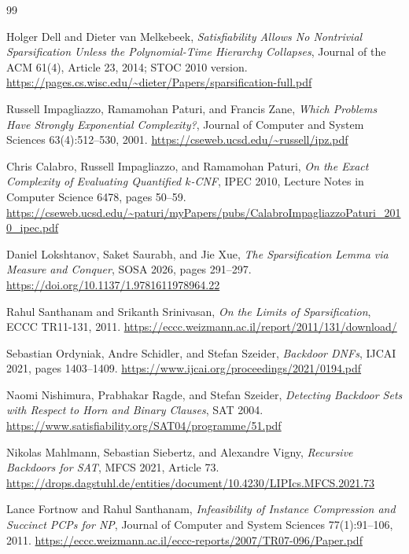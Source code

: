 \documentclass[11pt]{article}
\begin{document}
\begin{thebibliography}{99}

Holger Dell and Dieter van Melkebeek,
\emph{Satisfiability Allows No Nontrivial Sparsification Unless the
Polynomial-Time Hierarchy Collapses},
Journal of the ACM 61(4), Article 23, 2014; STOC 2010 version.
\url{https://pages.cs.wisc.edu/~dieter/Papers/sparsification-full.pdf}

Russell Impagliazzo, Ramamohan Paturi, and Francis Zane,
\emph{Which Problems Have Strongly Exponential Complexity?},
Journal of Computer and System Sciences 63(4):512--530, 2001.
\url{https://cseweb.ucsd.edu/~russell/ipz.pdf}

Chris Calabro, Russell Impagliazzo, and Ramamohan Paturi,
\emph{On the Exact Complexity of Evaluating Quantified $k$-CNF},
IPEC 2010, Lecture Notes in Computer Science 6478, pages 50--59.
\url{https://cseweb.ucsd.edu/~paturi/myPapers/pubs/CalabroImpagliazzoPaturi_2010_ipec.pdf}

Daniel Lokshtanov, Saket Saurabh, and Jie Xue,
\emph{The Sparsification Lemma via Measure and Conquer},
SOSA 2026, pages 291--297.
\url{https://doi.org/10.1137/1.9781611978964.22}

Rahul Santhanam and Srikanth Srinivasan,
\emph{On the Limits of Sparsification},
ECCC TR11-131, 2011.
\url{https://eccc.weizmann.ac.il/report/2011/131/download/}

Sebastian Ordyniak, Andre Schidler, and Stefan Szeider,
\emph{Backdoor DNFs},
IJCAI 2021, pages 1403--1409.
\url{https://www.ijcai.org/proceedings/2021/0194.pdf}

Naomi Nishimura, Prabhakar Ragde, and Stefan Szeider,
\emph{Detecting Backdoor Sets with Respect to Horn and Binary Clauses},
SAT 2004.
\url{https://www.satisfiability.org/SAT04/programme/51.pdf}

Nikolas Mahlmann, Sebastian Siebertz, and Alexandre Vigny,
\emph{Recursive Backdoors for SAT},
MFCS 2021, Article 73.
\url{https://drops.dagstuhl.de/entities/document/10.4230/LIPIcs.MFCS.2021.73}

Lance Fortnow and Rahul Santhanam,
\emph{Infeasibility of Instance Compression and Succinct PCPs for NP},
Journal of Computer and System Sciences 77(1):91--106, 2011.
\url{https://eccc.weizmann.ac.il/eccc-reports/2007/TR07-096/Paper.pdf}


\end{thebibliography}
\end{document}

